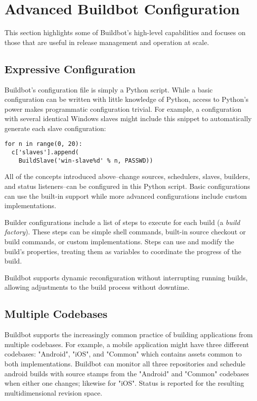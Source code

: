 \documentclass[conference]{IEEEtran}
\begin{document}
\section{Advanced Buildbot Configuration}

This section highlights some of Buildbot's high-level capabilities and focuses on those that are useful in release management and operation at scale.

\subsection{Expressive Configuration}

Buildbot's configuration file is simply a Python script.
While a basic configuration can be written with little knowledge of Python, access to Python's power makes programmatic configuration trivial.
For example, a configuration with several identical Windows slaves might include this snippet to automatically generate each slave configuration:

\begin{Verbatim}
for n in range(0, 20):
  c['slaves'].append(
    BuildSlave('win-slave%d' % n, PASSWD))
\end{Verbatim}

All of the concepts introduced above--change sources, schedulers, slaves, builders, and status listeners--can be configured in this Python script.
Basic configurations can use the built-in support while more advanced configurations include custom implementations.

Builder configurations include a list of steps to execute for each build (a \emph{build factory}\/).
These steps can be simple shell commands, built-in source checkout or build commands, or custom implementations.
Steps can use and modify the build's properties, treating them as variables to coordinate the progress of the build.

Buildbot supports dynamic reconfiguration without interrupting running builds, allowing adjustments to the build process without downtime.

\subsection{Multiple Codebases}

Buildbot supports the increasingly common practice of building applications from multiple codebases.
For example, a mobile application might have three different codebases: "Android", "iOS", and "Common" which contains assets common to both implementations.
Buildbot can monitor all three repositories and schedule android builds with source stamps from the "Android" and "Common" codebases when either one changes; likewise for "iOS".
Status is reported for the resulting multidimensional revision space.
\end{document}
